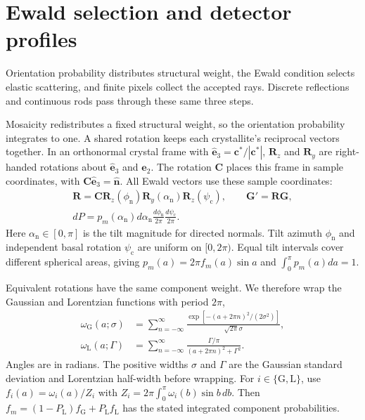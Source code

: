\section{Ewald selection and detector profiles}
\label{sec:si_detector_profiles}

Orientation probability distributes structural weight, the Ewald condition selects elastic scattering, and finite pixels collect the accepted rays. Discrete reflections and continuous rods pass through these same three steps.

Mosaicity redistributes a fixed structural weight, so the orientation probability integrates to one. A shared rotation keeps each crystallite's reciprocal vectors together. In an orthonormal crystal frame with $\hat{\mathbf e}_3=\mathbf c^*/|\mathbf c^*|$, $\mathbf R_z$ and $\mathbf R_y$ are right-handed rotations about $\hat{\mathbf e}_3$ and $\hat{\mathbf e}_2$. The rotation $\mathbf C$ places this frame in sample coordinates, with $\mathbf C\hat{\mathbf e}_3=\hat{\mathbf n}$. All Ewald vectors use these sample coordinates:
\begin{equation}
 \begin{aligned}
 \mathbf R=\mathbf C\mathbf R_z(\phi_{\mathrm n})\mathbf R_y(\alpha_{\mathrm n})\mathbf R_z(\psi_{\mathrm c}),
 \qquad \mathbf G'=\mathbf R\mathbf G,\\
 dP=p_m(\alpha_{\mathrm n})d\alpha_{\mathrm n}
       \frac{d\phi_{\mathrm n}}{2\pi}\frac{d\psi_{\mathrm c}}{2\pi}.
 \end{aligned}
 \label{eq:si_orientation_solid_angle}
\end{equation}
Here $\alpha_{\mathrm n}\in[0,\pi]$ is the tilt magnitude for directed normals. Tilt azimuth $\phi_{\mathrm n}$ and independent basal rotation $\psi_{\mathrm c}$ are uniform on $[0,2\pi)$. Equal tilt intervals cover different spherical areas, giving $p_m(a)=2\pi f_m(a)\sin a$ and $\int_0^\pi p_m(a)da=1$.

Equivalent rotations have the same component weight. We therefore wrap the Gaussian and Lorentzian functions with period $2\pi$,
\begin{equation}
 \begin{aligned}
 \omega_{\mathrm G}(a;\sigma)
 &=\sum_{n=-\infty}^{\infty}
 \frac{\exp[-(a+2\pi n)^2/(2\sigma^2)]}{\sqrt{2\pi}\sigma},\\
 \omega_{\mathrm L}(a;\Gamma)
 &=\sum_{n=-\infty}^{\infty}
 \frac{\Gamma/\pi}{(a+2\pi n)^2+\Gamma^2}.
 \end{aligned}
 \label{eq:si_wrapped_omega}
\end{equation}
Angles are in radians. The positive widths $\sigma$ and $\Gamma$ are the Gaussian standard deviation and Lorentzian half-width before wrapping. For $i\in\{\mathrm G,\mathrm L\}$, use $f_i(a)=\omega_i(a)/Z_i$ with $Z_i=2\pi\int_0^\pi\omega_i(b)\sin b\,db$. Then $f_m=(1-P_{\mathrm L})f_{\mathrm G}+P_{\mathrm L}f_{\mathrm L}$ has the stated integrated component probabilities.

